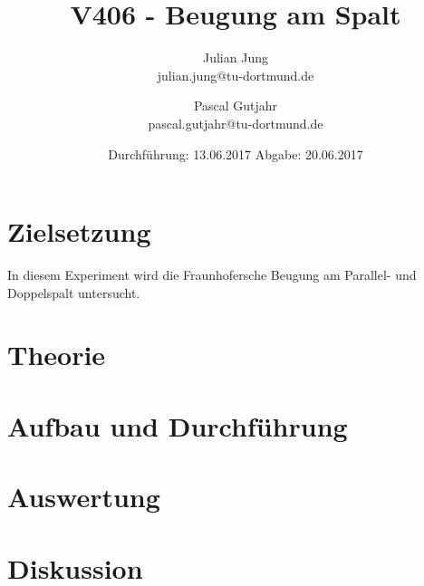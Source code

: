 

\title{V406 - Beugung am Spalt}
\author{Julian Jung \\ julian.jung@tu-dortmund.de
  \and Pascal Gutjahr \\ pascal.gutjahr@tu-dortmund.de}
  \date{Durchführung: 13.06.2017
  \hspace{3em}
  Abgabe: 20.06.2017}
  
\maketitle
\newpage
\tableofcontents
\newpage
\section{Zielsetzung}
In diesem Experiment wird die Fraunhofersche Beugung am Parallel- und
Doppelspalt untersucht.
\section{Theorie}
 
\section{Aufbau und Durchführung}
 
\section{Auswertung}
\section{Diskussion}
% 
\printbibliography

